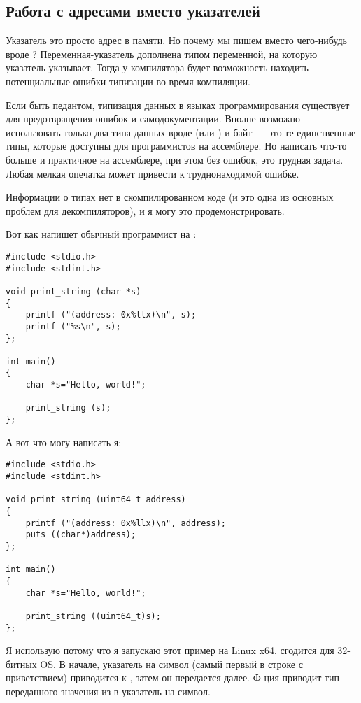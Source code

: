 \subsection{Работа с адресами вместо указателей}

Указатель это просто адрес в памяти. Но почему мы пишем  вместо чего-нибудь вроде ?
Переменная-указатель дополнена типом переменной, на которую указатель указывает.
Тогда у компилятора будет возможность находить потенциальные ошибки типизации во время компиляции.

Если быть педантом, типизация данных в языках программирования существует для предотвращения ошибок и самодокументации.
Вполне возможно использовать только два типа данных вроде  (или ) и байт --- это те единственные типы, которые
доступны для программистов на ассемблере.
Но написать что-то больше и практичное на ассемблере, при этом без ошибок, это трудная задача.
Любая мелкая опечатка может привести к труднонаходимой ошибке.

Информации о типах нет в скомпилированном коде (и это одна из основных проблем для декомпиляторов),
и я могу это продемонстрировать.

Вот как напишет обычный программист на \CCpp{}:

\begin{lstlisting}[style=customc]
#include <stdio.h>
#include <stdint.h>

void print_string (char *s)
{
	printf ("(address: 0x%llx)\n", s);
	printf ("%s\n", s);
};

int main()
{
	char *s="Hello, world!";

	print_string (s);
};
\end{lstlisting}

А вот что могу написать я:

\begin{lstlisting}[style=customc]
#include <stdio.h>
#include <stdint.h>

void print_string (uint64_t address)
{
	printf ("(address: 0x%llx)\n", address);
	puts ((char*)address);
};

int main()
{
	char *s="Hello, world!";

	print_string ((uint64_t)s);
};
\end{lstlisting}

Я использую  потому что я запускаю этот пример на Linux x64.  сгодится для 32-битных \ac{OS}.
В начале, указатель на символ (самый первый в строке с приветствием) приводится к , затем он передается далее.
Ф-ция  приводит тип переданного значения из  в указатель на символ.

